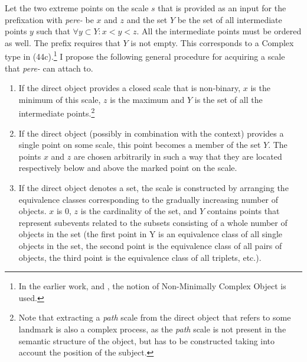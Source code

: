 Let the two extreme points on the scale $s$ that is provided as an input for the prefixation with \textit{pere-} be $x$ and $z$ and the set $Y$ be the set of all intermediate points $y$ such that $\forall y \subset Y:  x < y < z$. All the intermediate points must be ordered as well. The prefix requires that $Y$ is not empty. This corresponds to a Complex type in \citealt{Beavers:12} (44c).\footnote{In the earlier work, \citealt{Beavers:02} and \citealt{Beavers:08}, the notion of Non-Minimally Complex Object is used.} I propose the following general procedure for acquiring a scale that \textit{pere-} can attach to. 
\begin{enumerate}
\item If the direct object provides a closed scale that is non-binary, $x$ is the minimum of this scale, $z$ is the maximum and $Y$ is the set of all the intermediate points.\footnote{Note that extracting a \textit{path} scale from the direct object that refers to some landmark is also a complex process, as the \textit{path} scale is not present in the semantic structure of the object, but has to be constructed taking into account the position of the subject.}
\item If the direct object (possibly in combination with the context) provides a single point on some scale, this point becomes a member of the set $Y$. The points $x$ and $z$ are chosen arbitrarily in such a way that they are located respectively below and above the marked point on the scale. 
\item If the direct object denotes a set, the scale is constructed by arranging the equivalence classes corresponding to the gradually increasing number of objects. $x$ is 0, $z$ is the cardinality of the set, and $Y$ contains points that represent subevents related to the subsets consisting of a whole number of objects in the set (the first point in Y is an equivalence class of all single objects in the set, the second point is the equivalence class of all pairs of objects, the third point is the equivalence class of all triplets, etc.).
\end{enumerate}

